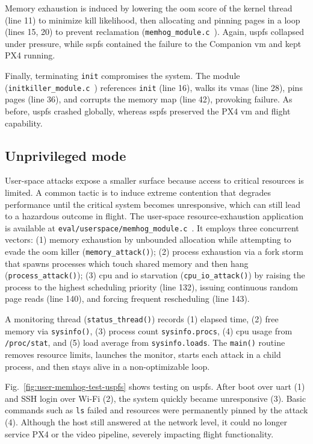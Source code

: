 Memory exhaustion is induced by lowering the \gls{oom} score of the kernel
thread (line 11) to minimize kill likelihood, then allocating and pinning pages
in a loop (lines 15, 20) to prevent reclamation
(\lstinline{memhog_module.c}~\cite{thesis-sw-github}). Again, \gls{uspfs}
collapsed under pressure, while \gls{sspfs} contained the failure to the
Companion \gls{vm} and kept PX4 running.

Finally, terminating \lstinline{init} compromises the system. The module
(\lstinline{initkiller_module.c}~\cite{thesis-sw-github}) references
\lstinline{init} (line 16), walks its \glspl{vma} (line 28), pins pages (line
36), and corrupts the memory map (line 42), provoking failure. As before,
\gls{uspfs} crashed globally, whereas \gls{sspfs} preserved the PX4 \gls{vm} and
flight capability.

\clearpage

\subsection{Unprivileged mode}
\label{sec:unprivileged-mode}
User-space attacks expose a smaller surface because access to critical resources
is limited. A common tactic is to induce extreme contention that degrades
performance until the critical system becomes unresponsive, which can still lead
to a hazardous outcome in flight.
%
The user-space resource-exhaustion application is available at
\lstinline{eval/userspace/memhog_module.c}~\cite{thesis-sw-github}. It employs three concurrent vectors:
(1) memory exhaustion by unbounded allocation while attempting to evade the \gls{oom} killer (\lstinline{memory_attack()});
(2) process exhaustion via a fork storm that spawns processes which touch shared memory and then hang (\lstinline{process_attack()});
(3) \gls{cpu} and \gls{io} starvation (\lstinline{cpu_io_attack()}) by raising the process to the highest scheduling priority (line 132), issuing continuous random page reads (line 140), and forcing frequent rescheduling (line 143).

A monitoring thread (\lstinline{status_thread()}) records (1) elapsed time, (2) free memory via \lstinline{sysinfo()}, (3) process count \lstinline{sysinfo.procs}, (4) \gls{cpu} usage from \lstinline{/proc/stat}, and (5) load average from \lstinline{sysinfo.loads}. The \lstinline{main()} routine removes resource limits, launches the monitor, starts each attack in a child process, and then stays alive in a non-optimizable loop.

Fig.~\ref{fig:user-memhog-test-uspfs} shows testing on \gls{uspfs}. After boot over \gls{uart} (1) and SSH login over Wi-Fi (2), the system quickly became unresponsive (3). Basic commands such as \lstinline{ls} failed and resources were permanently pinned by the attack (4). Although the host still answered at the network level, it could no longer service PX4 or the video pipeline, severely impacting flight functionality.

